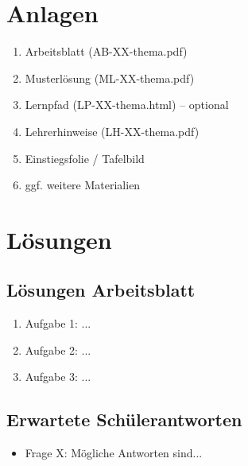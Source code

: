 \documentclass[11pt,a4paper]{article}
\begin{document}
\section{Anlagen}

\begin{enumerate}
    \item Arbeitsblatt (AB-XX-thema.pdf)
    \item Musterlösung (ML-XX-thema.pdf)
    \item Lernpfad (LP-XX-thema.html) -- optional
    \item Lehrerhinweise (LH-XX-thema.pdf)
    \item Einstiegsfolie / Tafelbild
    \item ggf. weitere Materialien
\end{enumerate}

\section{Lösungen}

\subsection{Lösungen Arbeitsblatt}
\begin{enumerate}
    \item Aufgabe 1: ...
    \item Aufgabe 2: ...
    \item Aufgabe 3: ...
\end{enumerate}

\subsection{Erwartete Schülerantworten}
\begin{itemize}
    \item Frage X: Mögliche Antworten sind...
\end{itemize}
\end{document}

